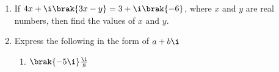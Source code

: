 \begin{enumerate}[label=\thesubsection.\arabic*, ref=\thesubsection.\theenumi]
	\item If $4x + \i\brak{3x-y} = 3 + \i\brak{-6}$, where $x$ and $y$ are real numbers, then find the values of $x$ and $y$.
	\item Express the following in the form of $a+b\i$
		\begin{enumerate}
			\item $\brak{-5\i}\frac{\i}{8}$
		\end{enumerate}
\end{enumerate}
\iffalse
Solve
\begin{enumerate}[label=\thesubsection.\arabic*, ref=\thesubsection.\theenumi,resume*]
	\begin{multicols}{2}
	\end{multicols}
\end{enumerate}
\fi
